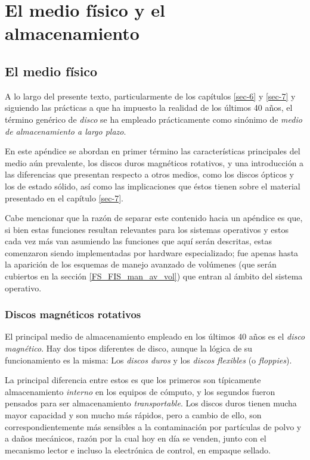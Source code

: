 \documentclass[11pt,fleqn]{book} %
\begin{document}
\chapter{El medio físico y el almacenamiento}
\label{sec-10}
\section{El medio físico}
\label{sec-10-1}
\label{FS_FIS}


A lo largo del presente texto, particularmente de los capítulos
\ref{sec-6} y \ref{sec-7} y siguiendo las prácticas a que ha impuesto la
realidad de los últimos 40 años, el término genérico de
\emph{disco} se ha empleado prácticamente como sinónimo de \emph{medio de almacenamiento a largo plazo}.

En este apéndice se abordan en primer término las características
principales del medio aún prevalente, los discos duros magnéticos
rotativos, y una introducción a las diferencias que presentan respecto
a otros medios, como los discos ópticos y los de estado sólido, así
como las implicaciones que éstos tienen sobre el material presentado
en el capítulo \ref{sec-7}.

Cabe mencionar que la razón de separar este contenido hacia un
apéndice es que, si bien estas funciones resultan relevantes para los
sistemas operativos y estos cada vez más van asumiendo las funciones
que aquí serán descritas, estas comenzaron siendo implementadas por
hardware especializado; fue apenas hasta la aparición de los esquemas
de manejo avanzado de volúmenes (que serán cubiertos en la sección
\ref{FS_FIS_man_av_vol}) que entran al ámbito del sistema operativo.
\subsection{Discos magnéticos rotativos}
\label{sec-10-1-1}


El principal medio de almacenamiento empleado en los últimos 40 años
es el \emph{disco magnético}. Hay dos tipos diferentes de disco, aunque la
lógica de su funcionamiento es la misma: Los \emph{discos duros} y los
\emph{discos flexibles} (o \emph{floppies}).

La principal diferencia entre estos es que los primeros son
típicamente almacenamiento \emph{interno} en los equipos de cómputo, y los
segundos fueron pensados para ser almacenamiento \emph{transportable}. Los
discos duros tienen mucha mayor capacidad y son mucho más rápidos,
pero a cambio de ello, son correspondientemente más sensibles a la
contaminación por partículas de polvo y a daños mecánicos, razón por
la cual hoy en día se venden, junto con el mecanismo lector e incluso
la electrónica de control, en empaque sellado.
\end{document}
